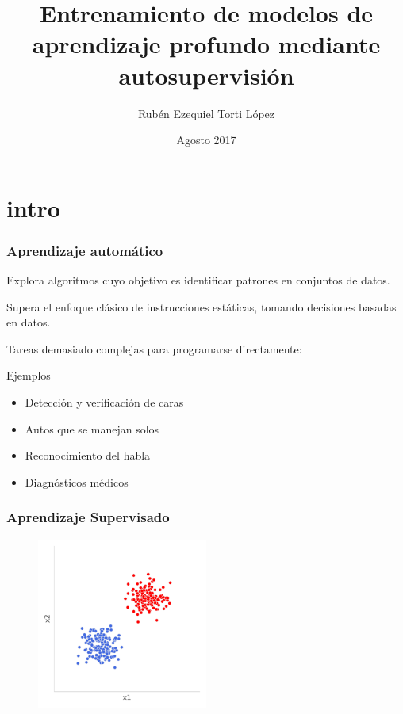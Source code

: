 \documentclass{beamer}
\title{Entrenamiento de modelos de aprendizaje profundo mediante autosupervisión}
\author
{Rubén Ezequiel Torti López}
\institute
{
  Facultad de Matemática, Astronomía, Física y Computación\\
  Universidad Nacional de Córdoba
}
\date
{Agosto 2017}
\begin{document}
\frame{\titlepage}




\section{intro}
\begin{frame}[plain]
\frametitle{Aprendizaje automático}
Explora algoritmos cuyo objetivo es identificar patrones en conjuntos de datos.\pause
\vfill

Supera el enfoque clásico de instrucciones estáticas, tomando decisiones basadas en datos.\pause
\vfill

Tareas demasiado complejas para programarse directamente:
\vfill
\begin{block}{Ejemplos}
\begin{itemize}
    \item Detección y verificación de caras
    \item Autos que se manejan solos 
    \item Reconocimiento del habla
    \item Diagnósticos médicos 
\end{itemize}
\end{block}
\end{frame}





\begin{frame}
\frametitle{Aprendizaje Supervisado}
\begin{figure}
    \centering
    \includegraphics[width=0.5\textwidth]{images/machinelearning1.pdf}
\end{figure}
\end{frame}
\end{document}
